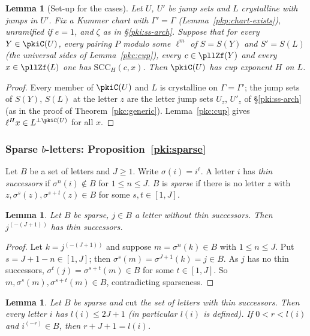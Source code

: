 \documentclass[10pt]{amsart}
\newtheorem{lemma}[theorem]{Lemma}
\theoremstyle{definition}
\theoremstyle{remark}
\begin{document}
\begin{lemma}[Set-up for the cases]\label{pkd:setup}
Let $U$, $U'$ be jump sets and $L$ crystalline with jumps in $U'$. Fix a Kummer chart with
$\Gamma'=\Gamma$ (Lemma~\ref{pkp:chart-exists}), unramified if $e=1$, and $\zeta$ as in
\S\ref{pki:ss-arch}. Suppose that for every $Y\in\pkiC(U)$, every pairing $P$ modulo some $\ell^m$ of
$S=S(Y)$ and $S'=S(L)$ (the universal sides of Lemma~\ref{pkc:cup}), every $c\in\pllZf(Y)$ and every
$x\in\pllZf(L)$ one has $\mathrm{SCC}_H(c,x)$. Then $\pkiC(U)$ has cup exponent $H$ on $L$.
\end{lemma}

\begin{proof}
Every member of $\pkiC(U)$ and $L$ is crystalline on $\Gamma=\Gamma'$; the jump sets of $S(Y)$, $S(L)$
at the letter $z$ are the letter jump sets $U_z$, $U'_z$ of \S\ref{pki:ss-arch} (as in the proof of
Theorem~\ref{pkc:generic}). Lemma~\ref{pkc:cup} gives $\ell^Hx\in L^{\perp\pkiC(U)}$ for all $x$.
\end{proof}

\subsubsection{Sparse $b$-letters: Proposition~\ref{pki:sparse}}\label{pkd:ss-sparse}

Let $B$ be a set of letters and $J\ge1$. Write $\sigma(i)=i^\ell$. A letter $i$ has \emph{thin
successors} if $\sigma^n(i)\notin B$ for $1\le n\le J$. $B$ is \emph{sparse} if there is no letter $z$
with $z,\sigma^s(z),\sigma^{s+t}(z)\in B$ for some $s,t\in[1,J]$.

\begin{lemma}\label{pkd:thin-add}
Let $B$ be sparse, $j\in B$ a letter without thin successors. Then $j^{(-(J+1))}$ has thin successors.
\end{lemma}

\begin{proof}
Let $k=j^{(-(J+1))}$ and suppose $m=\sigma^n(k)\in B$ with $1\le n\le J$. Put $s=J+1-n\in[1,J]$; then
$\sigma^s(m)=\sigma^{J+1}(k)=j\in B$. As $j$ has no thin successors, $\sigma^t(j)=\sigma^{s+t}(m)\in B$
for some $t\in[1,J]$. So $m,\sigma^s(m),\sigma^{s+t}(m)\in B$, contradicting sparseness.
\end{proof}

\begin{lemma}\label{pkd:thin-cut}
Let $B$ be sparse and $\mathrm{cut}$ the set of letters with thin successors. Then every letter $i$ has
$l(i)\le2J+1$ (in particular $l(i)$ is defined). If $0<r<l(i)$ and $i^{(-r)}\in B$, then
$r+J+1=l(i)$.
\end{lemma}
\end{document}
